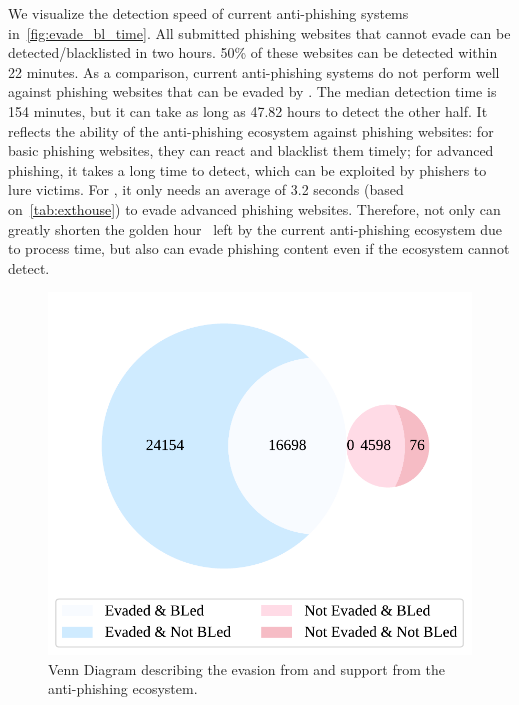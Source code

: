 We visualize the detection speed of current anti-phishing systems in~\autoref{fig:evade_bl_time}.
All submitted phishing websites that \spartacus cannot evade can be detected/blacklisted in two hours.
50\% of these websites can be detected within 22 minutes.
As a comparison, current anti-phishing systems do not perform well against phishing websites that can be evaded by \spartacus.
The median detection time is 154 minutes, but it can take as long as 47.82 hours to detect the other half.
It reflects the ability of the anti-phishing ecosystem against phishing websites: 
for basic phishing websites, they can react and blacklist them timely;
for advanced phishing, it takes a long time to detect, which can be exploited by phishers to lure victims.
For \spartacus, it only needs an average of 3.2 seconds (based on~\autoref{tab:exthouse}) to evade advanced phishing websites.
Therefore, \spartacus not only can greatly shorten the golden hour~\cite{oest2020sunrise} left by the current anti-phishing ecosystem due to process time, but also can evade phishing content even if the ecosystem cannot detect.


\begin{figure}
\centering
\includegraphics[width=\linewidth]{figs/venn_eval_3_new.pdf}
\caption{Venn Diagram describing the evasion from \spartacus and support from the anti-phishing ecosystem.}
\label{fig:venn_support}
\end{figure}


